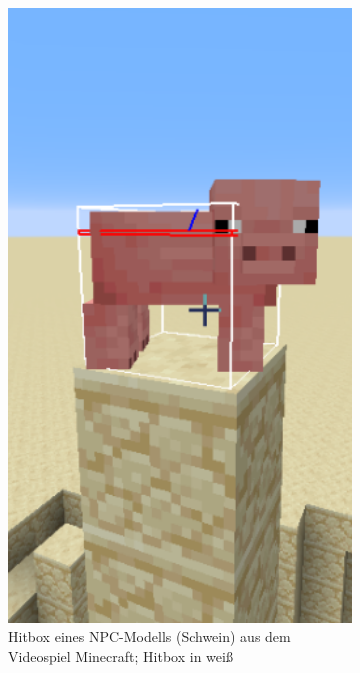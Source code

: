 \begin{figure}
\begin{subfigure}[t]{0.2\textwidth}
		\includegraphics[width=1\textwidth]{./res/pig_hitbox.png}
		\caption{Hitbox eines NPC-Modells (Schwein) aus dem Videospiel Minecraft; Hitbox in weiß}
		\label{fig:mphitbox}
	\end{subfigure}
~
	\begin{subfigure}[t]{0.2\textwidth}
		\centering

\end{subfigure}
\end{figure}
